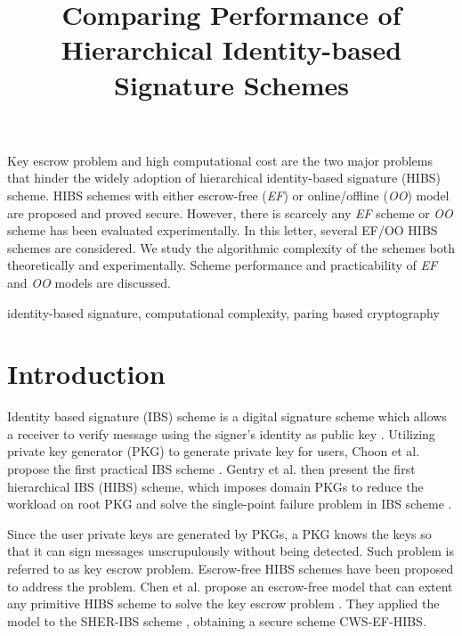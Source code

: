 \documentclass[letter]{ieice}
\title{Comparing Performance of Hierarchical Identity-based Signature Schemes}
\begin{document}
\maketitle
\begin{summary}
Key escrow problem and high computational cost are the two major problems that hinder the widely adoption of hierarchical identity-based signature (HIBS) scheme.
HIBS schemes with either escrow-free (\emph{EF}) or online/offline (\emph{OO}) model are proposed and proved secure.
However, there is scarcely any \emph{EF} scheme or \emph{OO} scheme has been evaluated experimentally.
In this letter, several EF/OO HIBS schemes are considered. 
We study the algorithmic complexity of the schemes both theoretically and experimentally.
Scheme performance and practicability of \emph{EF} and \emph{OO} models are discussed.
\end{summary}
\begin{keywords}
identity-based signature, computational complexity, paring based cryptography
\end{keywords}

\section{Introduction}
Identity based signature (IBS) scheme is a digital signature scheme which allows a receiver to verify message using the signer's identity as public key \cite{shamir1985identity}. 
Utilizing private key generator (PKG) to generate private key for users, Choon et al. propose the first practical IBS scheme \cite{choon2002identity}. 
Gentry et al. then present the first hierarchical IBS (HIBS) scheme, which imposes domain PKGs to reduce the workload on root PKG and solve the single-point failure problem in IBS scheme \cite{gentry2002hierarchical}. 
\par

Since the user private keys are generated by PKGs, a PKG knows the keys so that it can sign messages unscrupulously without being detected.
Such problem is referred to as key escrow problem.
Escrow-free HIBS schemes have been proposed to address the problem. 
Chen et al. propose an escrow-free model that can extent any primitive HIBS scheme to solve the key escrow problem \cite{anescrowfree2015chen}. 
They applied the model to the SHER-IBS scheme \cite{chow2004secure}, obtaining a secure scheme CWS-EF-HIBS.
\par
\end{document}
